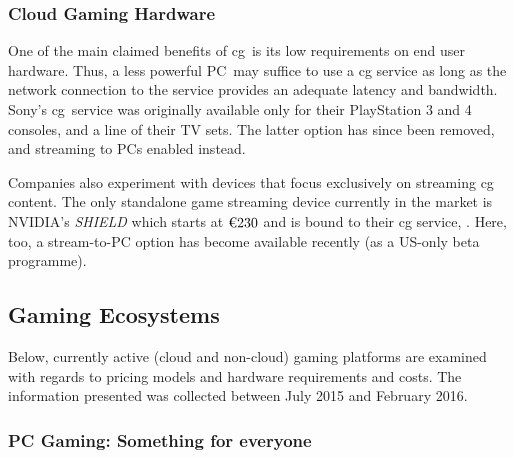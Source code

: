 \subsubsection{Cloud Gaming Hardware}
One of the main claimed benefits of \gls{cg} is its low requirements
on end user hardware. Thus, a less powerful \gls{PC} may suffice to
use a \gls{cg} service as long as the network connection to the
service provides an adequate latency and bandwidth.
Sony's \psnow \gls{cg} service was originally available only for their
PlayStation 3 and 4 consoles, and a line of their TV sets. The latter
option has since been removed, and streaming to \glspl{PC} enabled
instead.

Companies also experiment with devices that focus exclusively on streaming
\gls{cg} content. The only standalone game streaming device currently
in the market is NVIDIA's \textit{SHIELD} which starts at
$\text{\texteuro} 230$ and is bound to their \gls{cg} service, \gfnow.
Here, too, a stream-to-\gls{PC} option has become available recently
(as a US-only beta programme).



\subsection{Gaming Ecosystems}
Below, currently active (cloud and non-cloud) gaming platforms are examined
with regards to pricing models and hardware requirements and costs. The
information presented was collected between July 2015 and February 2016.

\subsubsection{\gls{PC} Gaming: Something for everyone}
\label{sec:pcgaming}

